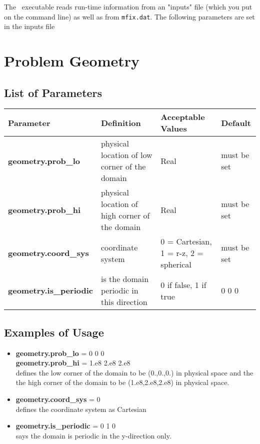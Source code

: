 The \mfix\ executable reads run-time information from an "inputs" file (which you put on the command line) 
as well as from {\tt mfix.dat}.  The following parameters are set in the inputs file

\section{Problem Geometry}

\subsection{List of Parameters}

\begin{table*}[h]
\begin{scriptsize}
\begin{tabular}{|l|l|l|l|} \hline
Parameter & Definition & Acceptable Values & Default \\
\hline
{\bf geometry.prob\_lo} & physical location of low corner of the domain & Real & must be set\\
{\bf geometry.prob\_hi} & physical location of high corner of the domain & Real  & must be set\\
{\bf geometry.coord\_sys} & coordinate system & 0 = Cartesian, 1 = r-z, 2 = spherical & must be set \\
{\bf geometry.is\_periodic} & is the domain periodic in this direction & 0 if false, 1 if true  & 0 0 0 \\
\hline
\end{tabular}
\label{Table:Geometry}
\end{scriptsize}
\end{table*}

\subsection{Examples of Usage}

\begin{itemize}

\item {\bf geometry.prob\_lo} = 0 0 0 \\
      {\bf geometry.prob\_hi} = 1.e8 2.e8 2.e8 \\
defines the  low corner of the domain to be (0.,0.,0.)       in physical space and the
        the high corner of the domain to be (1.e8,2.e8,2.e8) in physical space.  

\item {\bf geometry.coord\_sys} = 0 \\
defines the coordinate system as Cartesian 

\item {\bf geometry.is\_periodic} = 0 1 0 \\
says the domain is periodic in the y-direction only. 

\end{itemize}

